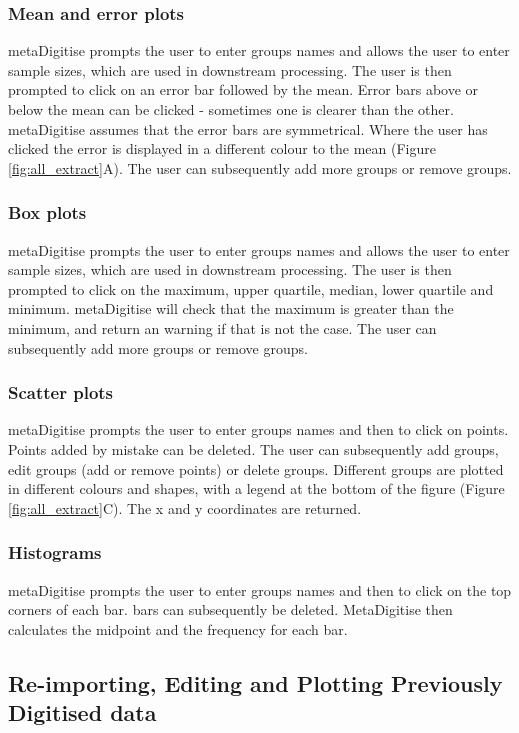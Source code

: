\documentclass{article}
\begin{document}
\subsubsection{Mean and error plots} 
metaDigitise prompts the user to enter groups names and allows the user to enter sample sizes, which are used in downstream processing. The user is then prompted to click on an error bar followed by the mean. Error bars above or below the mean can be clicked - sometimes one is clearer than the other. metaDigitise assumes that the error bars are symmetrical. Where the user has clicked the error is displayed in a different colour to the mean (Figure \ref{fig:all_extract}A). The user can subsequently add more groups or remove groups.

\subsubsection{Box plots}
 metaDigitise prompts the user to enter groups names and allows the user to enter sample sizes, which are used in downstream processing. The user is then prompted to click on the maximum, upper quartile, median, lower quartile and minimum. metaDigitise will check that the maximum is greater than the minimum, and return an warning if that is not the case. The user can subsequently add more groups or remove groups.

\subsubsection{Scatter plots}
 metaDigitise prompts the user to enter groups names and then to click on points. Points added by mistake can be deleted. The user can subsequently add groups, edit groups (add or remove points) or delete groups. Different groups are plotted in different colours and shapes, with a legend at the bottom of the figure (Figure \ref{fig:all_extract}C). The x and y coordinates are returned.

\subsubsection{Histograms}
metaDigitise prompts the user to enter groups names and then to click on the top corners of each bar. bars can subsequently be deleted. MetaDigitise then calculates the midpoint and the frequency for each bar. 

\subsection{Re-importing, Editing and Plotting Previously Digitised data}
\end{document}
